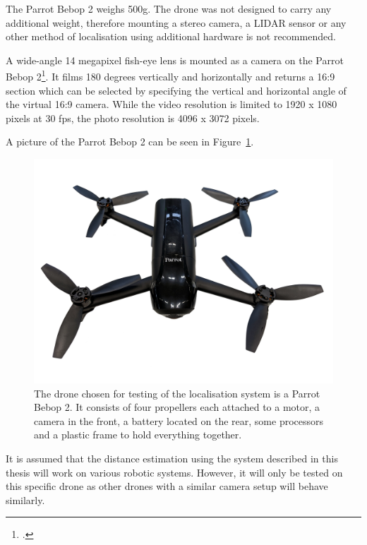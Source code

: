 The Parrot Bebop 2 weighs 500g. The drone was not designed to carry any additional weight, therefore mounting a stereo camera, a LIDAR sensor or any other method of localisation using additional hardware is not recommended.

A wide-angle 14 megapixel fish-eye lens is mounted as a camera on the Parrot Bebop 2\footcite{parrotBebop2}. It films 180 degrees vertically and horizontally and returns a 16:9 section which can be selected by specifying the vertical and horizontal angle of the virtual 16:9 camera. While the video resolution is limited to 1920 x 1080 pixels at 30 fps, the photo resolution is 4096 x 3072 pixels.

A picture of the Parrot Bebop 2 can be seen in Figure~\ref{pic:introduction_equipment_parrotBebop2}.

\begin{figure}[h]
	\centering
	\includegraphics[width=4.5in]{img/introduction_equipment_parrotBebop2.jpg}
	\caption{The drone chosen for testing of the localisation system is a Parrot Bebop 2. It consists of four propellers each attached to a motor, a camera in the front, a battery located on the rear, some processors and a plastic frame to hold everything together.}
	\label{pic:introduction_equipment_parrotBebop2}
\end{figure}

It is assumed that the distance estimation using the system described in this thesis will work on various robotic systems. However, it will only be tested on this specific drone as other drones with a similar camera setup will behave similarly.

\filbreak
